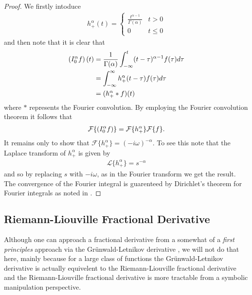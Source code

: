 \begin{proof}
    We firstly intoduce
    \begin{align}
        h_+^\alpha(t) = \begin{cases}
            \frac{t^{\alpha-1}}{\Gamma(\alpha)} & t > 0 \\
            0   & t \leq 0
        \end{cases} 
    \end{align} and then note that it is clear that
    \begin{align}
        \left( I_{0}^{\alpha} f \right)(t) &= \frac{1}{\Gamma(\alpha)} \int_{-\infty}^t (t-\tau)^{\alpha-1} f(\tau)d\tau \\
            &= \int_{-\infty}^\infty h_+^\alpha(t-\tau)f(\tau)d\tau \\
            &= (h_+^\alpha * f)(t)
    \end{align}
    where $ * $ represents the Fourier convolution.
    By employing the Fourier convolution theorem it follows that
    \begin{align}
         \mathcal{F}\{ \left( I_{0}^{\alpha} f \right) \} = \mathcal{F}\{ h_+^\alpha \}\mathcal{F}\{f\}.
    \end{align}
    It remains only to show that $ \mathcal{F}\{h_+^\alpha\} = (-i\omega)^{-\alpha} $. To see this note that the Laplace transform of $ h_+^\alpha $ is given by
    \begin{align}
        \mathcal{L}\{h_+^\alpha\} = s^{-\alpha} 
    \end{align}
    and so by replacing $ s $ with $ -i\omega $, as in the Fourier transform we get the result. The convergence of the Fourier integral is guarenteed by Dirichlet's theorem for Fourier integrals as noted in \cite{Podlubny1999}. 
\end{proof}
\subsection{Riemann-Liouville Fractional Derivative}
Although one can approach a fractional derivative from a somewhat of a \emph{first principles} approach via the Gr{\"u}nwald-Letnikov derivative \cite{Podlubny1999, Samko1993}, we will not do that here, mainly because for a large class of functions the Gr{\"u}nwald-Letnikov derivative is actually equivelent to the Riemann-Liouville fractional derivative \cite{Podlubny1999} and the Riemann-Liouville fractional derivative is more tractable from a symbolic manipulation perspective.

